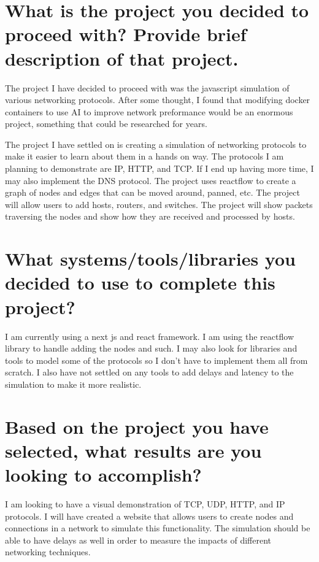 \documentclass{assignment-x}
\begin{document}
\maketitle
\pagebreak

\section{What is the project you decided to proceed with? Provide brief description of that project.}
The project I have decided to proceed with was the javascript simulation of various networking protocols. After some thought, I found that modifying docker containers to use AI to improve network preformance would be an enormous project, something that could be researched for years. 

The project I have settled on is creating a simulation of networking protocols to make it easier to learn about them in a hands on way. The protocols I am planning to demonstrate are IP, HTTP, and TCP. If I end up having more time, I may also implement the DNS protocol. The project uses reactflow to create a graph of nodes and edges that can be moved around, panned, etc. The project will allow users to add hosts, routers, and switches. The project will show packets traversing the nodes and show how they are received and processed by hosts. 

\section{What systems/tools/libraries you decided to use to complete this project?}
I am currently using a next js and react framework. I am using the reactflow library to handle adding the nodes and such. I may also look for libraries and tools to model some of the protocols so I don't have to implement them all from scratch. I also have not settled on any tools to add delays and latency to the simulation to make it more realistic.

\section{Based on the project you have selected, what results are you looking to accomplish?}
I am looking to have a visual demonstration of TCP, UDP, HTTP, and IP protocols. I will have created a website that allows users to create nodes and connections in a network to simulate this functionality. The simulation should be able to have delays as well in order to measure the impacts of different networking techniques. 
\end{document}
